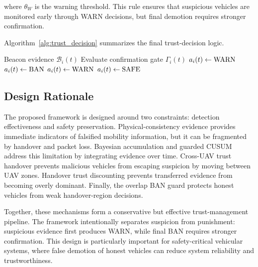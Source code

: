 \documentclass[journal]{IEEEtran}
\begin{document}
where \(\theta_W\) is the warning threshold. This rule ensures that suspicious vehicles are monitored early through WARN decisions, but final demotion requires stronger confirmation.

Algorithm~\ref{alg:trust_decision} summarizes the final trust-decision logic.

\begin{algorithm}[!t]
\caption{Adaptive Trust Enforcement Procedure}
\label{alg:trust_decision}
\begin{algorithmic}[1]
\REQUIRE Beacon evidence $\mathcal{B}_i(t)$
    \STATE Evaluate confirmation gate $\Gamma_i(t)$
            \STATE $a_i(t) \leftarrow \text{\text{WARN}}$ 
        \ELSE
            \STATE $a_i(t) \leftarrow \text{\text{BAN}}$
        \ENDIF
        \STATE $a_i(t) \leftarrow \text{\text{WARN}}$
    \ELSE
        \STATE $a_i(t) \leftarrow \text{\text{SAFE}}$
    \ENDIF
\ENDFOR
\end{algorithmic}
\end{algorithm}

\subsection{Design Rationale}
\label{subsec:design_rationale}

The proposed framework is designed around two constraints: detection effectiveness and safety preservation. Physical-consistency evidence provides immediate indicators of falsified mobility information, but it can be fragmented by handover and packet loss. Bayesian accumulation and guarded CUSUM address this limitation by integrating evidence over time. Cross-UAV trust handover prevents malicious vehicles from escaping suspicion by moving between UAV zones. Handover trust discounting prevents transferred evidence from becoming overly dominant. Finally, the overlap BAN guard protects honest vehicles from weak handover-region decisions.

Together, these mechanisms form a conservative but effective trust-management pipeline. The framework intentionally separates suspicion from punishment: suspicious evidence first produces WARN, while final BAN requires stronger confirmation. This design is particularly important for safety-critical vehicular systems, where false demotion of honest vehicles can reduce system reliability and trustworthiness.
\end{document}
